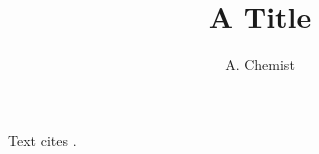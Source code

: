 \documentclass[journal=jacsat,manuscript=article]{achemso}
\author{A. Chemist}
\affiliation{A University}
\title{A Title}
\begin{document}
Text cites \cite{pauling}.

\end{document}
